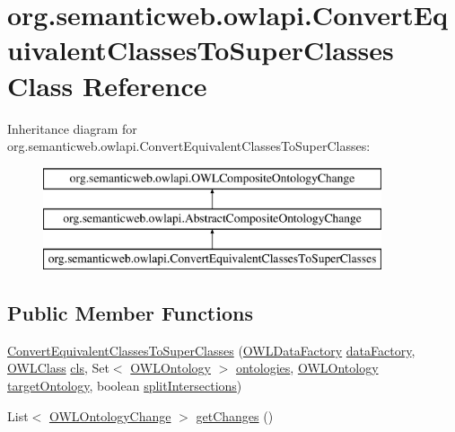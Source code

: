 \hypertarget{classorg_1_1semanticweb_1_1owlapi_1_1_convert_equivalent_classes_to_super_classes}{\section{org.\-semanticweb.\-owlapi.\-Convert\-Equivalent\-Classes\-To\-Super\-Classes Class Reference}
\label{classorg_1_1semanticweb_1_1owlapi_1_1_convert_equivalent_classes_to_super_classes}
}
Inheritance diagram for org.\-semanticweb.\-owlapi.\-Convert\-Equivalent\-Classes\-To\-Super\-Classes\-:\begin{figure}[H]
\begin{center}
\leavevmode
\includegraphics[height=3.000000cm]{classorg_1_1semanticweb_1_1owlapi_1_1_convert_equivalent_classes_to_super_classes}
\end{center}
\end{figure}
\subsection*{Public Member Functions}
\begin{DoxyCompactItemize}
\item 
\hyperlink{classorg_1_1semanticweb_1_1owlapi_1_1_convert_equivalent_classes_to_super_classes_aef257dcdd8598756930ce199d1bf931d}{Convert\-Equivalent\-Classes\-To\-Super\-Classes} (\hyperlink{interfaceorg_1_1semanticweb_1_1owlapi_1_1model_1_1_o_w_l_data_factory}{O\-W\-L\-Data\-Factory} \hyperlink{classorg_1_1semanticweb_1_1owlapi_1_1_abstract_composite_ontology_change_aebcfd0601543ebb5f72b1fe53a5352c9}{data\-Factory}, \hyperlink{interfaceorg_1_1semanticweb_1_1owlapi_1_1model_1_1_o_w_l_class}{O\-W\-L\-Class} \hyperlink{classorg_1_1semanticweb_1_1owlapi_1_1_convert_equivalent_classes_to_super_classes_af9d487e4ebdce59f98f4c7366c4ce12c}{cls}, Set$<$ \hyperlink{interfaceorg_1_1semanticweb_1_1owlapi_1_1model_1_1_o_w_l_ontology}{O\-W\-L\-Ontology} $>$ \hyperlink{classorg_1_1semanticweb_1_1owlapi_1_1_convert_equivalent_classes_to_super_classes_a30397ac9b4353db06705cc1585b235cd}{ontologies}, \hyperlink{interfaceorg_1_1semanticweb_1_1owlapi_1_1model_1_1_o_w_l_ontology}{O\-W\-L\-Ontology} \hyperlink{classorg_1_1semanticweb_1_1owlapi_1_1_convert_equivalent_classes_to_super_classes_ac3c217dfc21f6996f8c786eeb178afed}{target\-Ontology}, boolean \hyperlink{classorg_1_1semanticweb_1_1owlapi_1_1_convert_equivalent_classes_to_super_classes_addb6f40f0ea084faa384ce22690b17c0}{split\-Intersections})
\item 
List$<$ \hyperlink{classorg_1_1semanticweb_1_1owlapi_1_1model_1_1_o_w_l_ontology_change}{O\-W\-L\-Ontology\-Change} $>$ \hyperlink{classorg_1_1semanticweb_1_1owlapi_1_1_convert_equivalent_classes_to_super_classes_a9651ac0c0e2e5d1a433b807b365ef818}{get\-Changes} ()
\end{DoxyCompactItemize}
